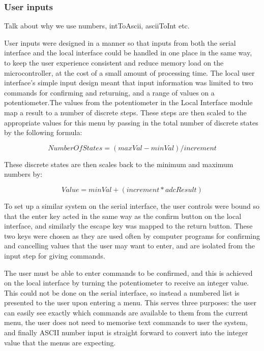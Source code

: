 \documentclass[]{report}
\begin{document}
\subsubsection{User inputs}
Talk about why we use numbers, intToAscii, asciiToInt etc.

User inputs were designed in a manner so that inputs from both the serial interface and the local interface could be handled in one place in the same way, to keep the user experience consistent and reduce memory load on the microcontroller, at the cost of a small amount of processing time. The local user interface's simple input design meant that input information was limited to two commands for confirming and returning, and a range of values on a potentiometer.The values from the potentiometer in the Local Interface module map a result to a number of discrete steps. These steps are then scaled to the appropriate values for this menu by passing in the total number of discrete states by the following formula:

\begin{equation}
NumberOfStates = (maxVal-minVal)/increment
\end{equation}

These discrete states are then scales back to the minimum and maximum numbers by:

\begin{equation}
Value = minVal + (increment * adcResult)
\end{equation}

To set up a similar system on the serial interface, the user controls were bound so that the enter key acted in the same way as the confirm button on the local interface, and similarly the escape key was mapped to the return button. These two keys were chosen as they are used often by computer programs for confirming and cancelling values that the user may want to enter, and are isolated from the input step for giving commands. 

The user must be able to enter commands to be confirmed, and this is achieved on the local interface by turning the potentiometer to receive an integer value. This could not be done on the serial interface, so instead a numbered list is presented to the user upon entering a menu. This serves three purposes: the user can easily see exactly which commands are available to them from the current menu, the user does not need to memorise text commands to user the system, and finally ASCII number input is straight forward to convert into the integer value that the menus are expecting. 
\end{document}
